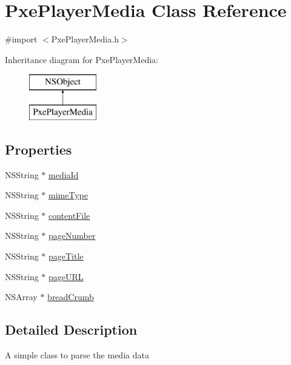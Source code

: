\hypertarget{interface_pxe_player_media}{\section{Pxe\-Player\-Media Class Reference}
\label{interface_pxe_player_media}
}


{\ttfamily \#import $<$Pxe\-Player\-Media.\-h$>$}

Inheritance diagram for Pxe\-Player\-Media\-:\begin{figure}[H]
\begin{center}
\leavevmode
\includegraphics[height=2.000000cm]{interface_pxe_player_media}
\end{center}
\end{figure}
\subsection*{Properties}
\begin{DoxyCompactItemize}
\item 
N\-S\-String $\ast$ \hyperlink{interface_pxe_player_media_a718bc251d9da974b96147c52afaa33ce}{media\-Id}
\item 
N\-S\-String $\ast$ \hyperlink{interface_pxe_player_media_a4545ba2ae21c08b68a120c469f9bcbdd}{mime\-Type}
\item 
N\-S\-String $\ast$ \hyperlink{interface_pxe_player_media_ad705b8e28d0db1eef322d96b8e567c30}{content\-File}
\item 
N\-S\-String $\ast$ \hyperlink{interface_pxe_player_media_aede96584e0b5b76d805532fe2c1f9a11}{page\-Number}
\item 
N\-S\-String $\ast$ \hyperlink{interface_pxe_player_media_acff05c6eaa894aeb7c9226eddce9b1da}{page\-Title}
\item 
N\-S\-String $\ast$ \hyperlink{interface_pxe_player_media_a432762edad9b851c6644edf38e55fc80}{page\-U\-R\-L}
\item 
N\-S\-Array $\ast$ \hyperlink{interface_pxe_player_media_a9704e9a15dddf82344badf9708b1b70c}{bread\-Crumb}
\end{DoxyCompactItemize}


\subsection{Detailed Description}
A simple class to parse the media data 


